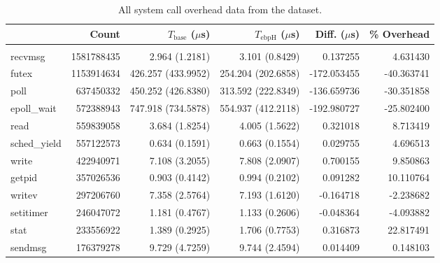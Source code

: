 \begin{longtable}{>{\ttfamily}lrrrrr}
\caption{All system call overhead data from the  dataset.}\label{tab:arch_3day_full}\\
\toprule
\multicolumn{1}{l}{System Call} &       Count & $T_\text{base}$ ($\mu$s) & $T_\text{ebpH}$ ($\mu$s) &  Diff. ($\mu$s) &  \% Overhead \\
\midrule
\endfirsthead
\endhead
\midrule
\multicolumn{6}{r}{{Continued on next page}} \\
\midrule
\endfoot

\bottomrule
\endlastfoot
                        recvmsg &  1581788435 &           2.964 (1.2181) &           3.101 (0.8429) &        0.137255 &     4.631430 \\
                          futex &  1153914634 &       426.257 (433.9952) &       254.204 (202.6858) &     -172.053455 &   -40.363741 \\
                           poll &   637450332 &       450.252 (426.8380) &       313.592 (222.8349) &     -136.659736 &   -30.351858 \\
                    epoll\_wait &   572388943 &       747.918 (734.5878) &       554.937 (412.2118) &     -192.980727 &   -25.802400 \\
                           read &   559839058 &           3.684 (1.8254) &           4.005 (1.5622) &        0.321018 &     8.713419 \\
                   sched\_yield &   557122573 &           0.634 (0.1591) &           0.663 (0.1554) &        0.029755 &     4.696513 \\
                          write &   422940971 &           7.108 (3.2055) &           7.808 (2.0907) &        0.700155 &     9.850863 \\
                         getpid &   357026536 &           0.903 (0.4142) &           0.994 (0.2102) &        0.091282 &    10.110764 \\
                         writev &   297206760 &           7.358 (2.5764) &           7.193 (1.6120) &       -0.164718 &    -2.238682 \\
                      setitimer &   246047072 &           1.181 (0.4767) &           1.133 (0.2606) &       -0.048364 &    -4.093882 \\
                           stat &   233556922 &           1.389 (0.2925) &           1.706 (0.7753) &        0.316873 &    22.817491 \\
                        sendmsg &   176379278 &           9.729 (4.7259) &           9.744 (2.4594) &        0.014409 &     0.148103 \\

\end{longtable}
